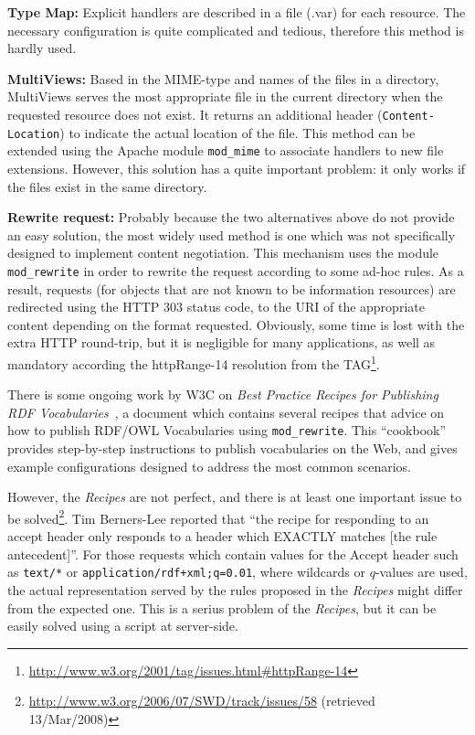 \documentclass{../templates/llncs}
\begin{document}
\begin{description}

  \item \textbf{Type Map:} Explicit handlers are described in a file (.var) for 
        each resource. The necessary configuration is quite complicated and 
        tedious, therefore this method is hardly used.

  \item \textbf{MultiViews:} Based in the MIME-type and names of the files 
        in a directory, MultiViews serves the most appropriate file in the current 
        directory when the requested resource does not exist. It returns 
        an additional header (\texttt{Content-Location}) to indicate the actual 
        location of the file. This method can be extended using the Apache module \texttt{mod\_mime} 
        to associate handlers to new file extensions. However, this solution
        has a quite important problem: it only works if the files exist in
        the same directory.

  \item \textbf{Rewrite request:} Probably because the two alternatives above
        do not provide an easy solution, the most widely used method is one 
        which was not specifically designed to implement content negotiation. 
        This mechanism uses the module \texttt{mod\_rewrite} in order to rewrite the 
        request according to some ad-hoc rules.
        As a result, requests (for objects that are not known to be information resources)
        are redirected using the HTTP 303 status code, to the URI of the appropriate
        content depending on the format requested.
        Obviously,  
        some time is lost with the extra HTTP round-trip, but it is negligible for
        many applications,
        as well as mandatory according the httpRange-14 resolution from the
        TAG\footnote{\url{http://www.w3.org/2001/tag/issues.html#httpRange-14}}.

\end{description}

There is some ongoing work by W3C on \textit{Best Practice Recipes for Publishing 
RDF Vocabularies}~\cite{Recipes}, a document which contains several recipes that advice on how 
to publish RDF/OWL Vocabularies using \texttt{mod\_rewrite}. This ``cookbook'' 
provides step-by-step instructions to publish vocabularies on the Web, and gives
example configurations designed to address the most common scenarios.

However, the \textit{Recipes} are not perfect, and there is at least one important issue to 
be solved\footnote{\url{http://www.w3.org/2006/07/SWD/track/issues/58} (retrieved 13/Mar/2008)}.
Tim Berners-Lee reported that ``the recipe for responding to an accept 
header only responds to a header which EXACTLY matches [the rule antecedent]''.
For those requests which contain values for the Accept header such as 
\texttt{text/*} or \texttt{application/rdf+xml;q=0.01}, where wildcards or
$q$-values are used, the actual representation served by the
rules proposed in the \textit{Recipes} might differ from the expected one. This is a serius problem
of the \textit{Recipes}, but it can be easily solved using a script at server-side.
\end{document}
